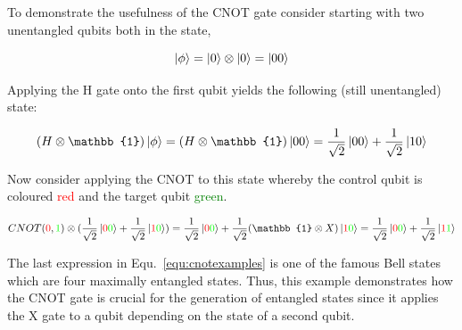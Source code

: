 To demonstrate the usefulness of the CNOT gate consider starting with two unentangled qubits both in the \0 state,

\begin{equation}
\ket{\phi} = \ket{0} \otimes \ket{0} = \ket{00}
\end{equation}

Applying the H gate onto the first qubit yields the following (still unentangled) state:

\begin{equation}
(H \otimes \mathbb{1}) \ket{\phi} = (H \otimes \mathbb{1}) \ket{00} = \frac{1}{\sqrt{2}} \ket{00} + \frac{1}{\sqrt{2}} \ket{10} 
\end{equation}

Now consider applying the CNOT to this state whereby the control qubit is coloured \textcolor{red}{red} and the target qubit \textcolor{green}{green}.

\begin{equation}
\label{equ:cnotexamples}
CNOT(\textcolor{red}{0},\textcolor{green}{1}) \otimes (\frac{1}{\sqrt{2}} \ket{\textcolor{red}{0}\textcolor{green}{0}} + \frac{1}{\sqrt{2}} \ket{\textcolor{red}{1}\textcolor{green}{0}}) = \frac{1}{\sqrt{2}} \ket{\textcolor{red}{0}\textcolor{green}{0}} + \frac{1}{\sqrt{2}} (\mathbb{1} \otimes X) \ket{\textcolor{red}{1}\textcolor{green}{0}} = \frac{1}{\sqrt{2}} \ket{\textcolor{red}{0}\textcolor{green}{0}} + \frac{1}{\sqrt{2}} \ket{\textcolor{red}{1}\textcolor{green}{1}}
\end{equation}

The last expression in Equ.~\ref{equ:cnotexamples} is one of the famous Bell states which are four maximally entangled states. Thus, this example demonstrates how the CNOT gate is crucial for the generation of entangled states since it applies the X gate to a qubit depending on the state of a second qubit.

